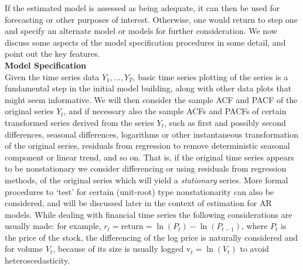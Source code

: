 If the estimated model is assessed as being adequate, it can then be used for forecasting or other purposes of interest. Otherwise, one would return to step one and specify an alternate model or models for further consideration. We now discuss some aspects of the model specification procedures in some detail, and point out the key features. \\


\noindent\textbf{Model Specification} \\


Given the time series data $Y_1, \ldots, Y_T$, basic time series  plotting of the series is a fundamental step in the initial model building, along with other data plots that might seem informative. We will then consider the sample ACF and PACF of the original series $Y_t$, and if necessary also the sample ACFs and PACFs of certain transformed series derived from the series $Y_t$, such as first and possibly second differences, seasonal differences, logarithms or other instantaneous transformation of the original series, residuals from regression to remove deterministic seasonal component or linear trend, and so on. That is, if the original time series appears to be nonstationary we consider differencing or using residuals from regression methods, of the original series which will yield a \emph{stationary} series. More formal procedures to `test' for certain (unit-root) type nonstationarity can also be considered, and will be discussed later in the context of estimation for AR models.  While dealing with financial time series the following considerations are usually made: for example, $r_t= \text{return} = \ln(P_t) - \ln(P_{t-1})$, where $P_t$ is the price of the stock, the differencing of the log price is naturally considered and for volume $V_t$, because of its size is usually logged $\text{v}_t= \ln(V_t)$ to avoid heteroscedasticity.



